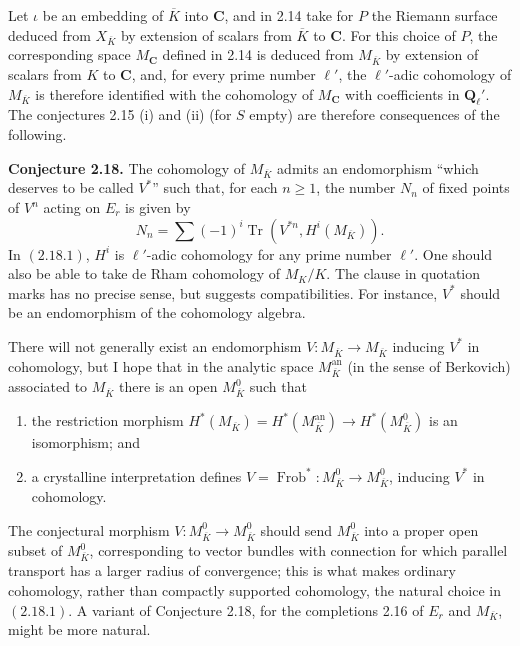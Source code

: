 \documentclass[11pt]{article}
\newcommand{\Ql}{\mathbf Q_\ell}
\newcommand{\Frob}{\operatorname{Frob}}
\newcommand{\Tr}{\operatorname{Tr}}
\begin{document}
Let \(\iota\) be an embedding of \(\overline K\) into \(\mathbf C\), and in 2.14 take for \(P\) the Riemann surface deduced from \(X_{\overline K}\) by extension of scalars from \(\overline K\) to \(\mathbf C\). For this choice of \(P\), the corresponding space \(M_\mathbf C\) defined in 2.14 is deduced from \(M_{\overline K}\) by extension of scalars from \(K\) to \(\mathbf C\), and, for every prime number \(\ell'\), the \(\ell'\)-adic cohomology of \(M_{\overline K}\) is therefore identified with the cohomology of \(M_\mathbf C\) with coefficients in \(\Ql'\). The conjectures 2.15 (i) and (ii) (for \(S\) empty) are therefore consequences of the following.

\textbf{Conjecture 2.18.} The cohomology of \(M_{\overline K}\) admits an endomorphism ``which deserves to be called \(V^*\)'' such that, for each \(n\ge 1\), the number \(N_n\) of fixed points of \(V^n\) acting on \(E_r\) is given by
\begin{equation}\tag{2.18.1}
N_n=\sum (-1)^i\Tr(V^{*n},H^i(M_{\overline K})).
\end{equation}
In \((2.18.1)\), \(H^i\) is \(\ell'\)-adic cohomology for any prime number \(\ell'\). One should also be able to take de Rham cohomology of \(M_K/K\). The clause in quotation marks has no precise sense, but suggests compatibilities. For instance, \(V^*\) should be an endomorphism of the cohomology algebra.

There will not generally exist an endomorphism \(V:M_{\overline K}\to M_{\overline K}\) inducing \(V^*\) in cohomology, but I hope that in the analytic space \(M^{\mathrm{an}}_{\overline K}\) (in the sense of Berkovich) associated to \(M_{\overline K}\) there is an open \(M^0_{\overline K}\) such that
\begin{enumerate}[label=(\alph*)]
\item the restriction morphism \(H^*(M_{\overline K})=H^*(M^{\mathrm{an}}_{\overline K})\to H^*(M^0_{\overline K})\) is an isomorphism; and
\item a crystalline interpretation defines \(V=\Frob^*:M^0_{\overline K}\to M^0_{\overline K}\), inducing \(V^*\) in cohomology.
\end{enumerate}
The conjectural morphism \(V:M^0_{\overline K}\to M^0_{\overline K}\) should send \(M^0_{\overline K}\) into a proper open subset of \(M^0_{\overline K}\), corresponding to vector bundles with connection for which parallel transport has a larger radius of convergence; this is what makes ordinary cohomology, rather than compactly supported cohomology, the natural choice in \((2.18.1)\). A variant of Conjecture 2.18, for the completions 2.16 of \(E_r\) and \(M_{\overline K}\), might be more natural.
\end{document}
